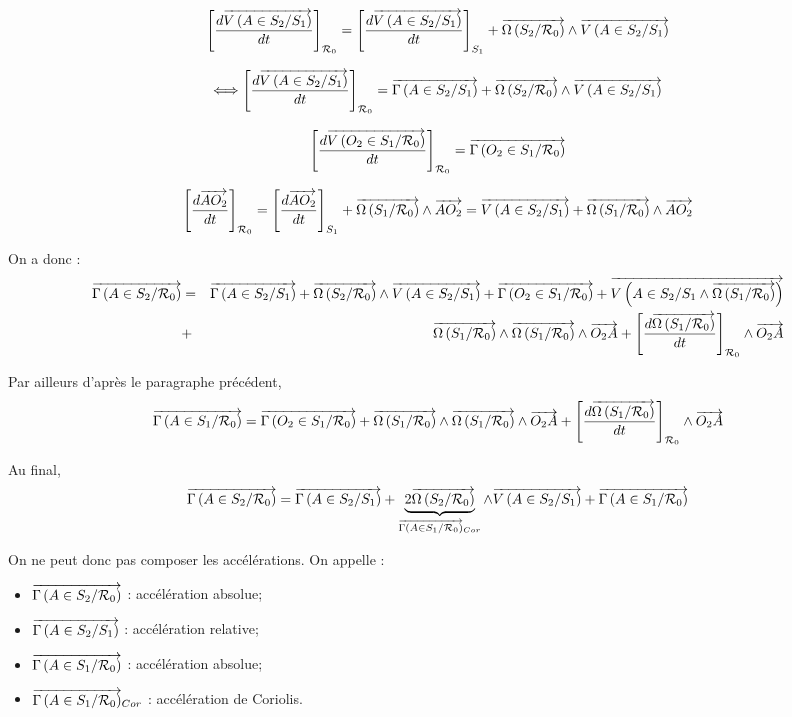 \documentclass[10pt,oneside]{article}
\begin{document}
$$
\left[
\dfrac{d
\vectv{A}{S_2}{S_1} }{dt}
\right]_{\mathcal{R}_0}
=
\left[
\dfrac{d
\vectv{A}{S_2}{S_1} }{dt}
\right]_{S_1}
+
\vecto{S_2}{\mathcal{R}_0}\wedge\vectv{A}{S_2}{S_1}
$$

$$
\Longleftrightarrow
\left[
\dfrac{d
\vectv{A}{S_2}{S_1} }{dt}
\right]_{\mathcal{R}_0}
=
\vectg{A}{S_2}{S_1} 
+
\vecto{S_2}{\mathcal{R}_0}\wedge\vectv{A}{S_2}{S_1}
$$


$$
\left[
\dfrac{d\vectv{O_2}{S_1}{\mathcal{R}_0}}{dt}
\right]_{\mathcal{R}_0} 
= \vectg{O_2}{S_1}{\mathcal{R}_0}
$$

$$
\left[
\dfrac{d\vect{AO_2}}{dt}
\right]_{\mathcal{R}_0}
=
\left[
\dfrac{d\vect{AO_2}}{dt}
\right]_{S_1}
+
\vecto{S_1}{\mathcal{R}_0}
\wedge 
\vect{AO_2}
=
\vectv{A}{S_2}{S_1}+
\vecto{S_1}{\mathcal{R}_0}
\wedge 
\vect{AO_2}
$$


On a donc : 
\begin{eqnarray*}
\vectg{A}{S_2}{\mathcal{R}_0}
&=&
\vectg{A}{S_2}{S_1} + \vecto{S_2}{\mathcal{R}_0}\wedge\vectv{A}{S_2}{S_1}
+\vectg{O_2}{S_1}{\mathcal{R}_0}
+\vectv{A}{S_2}{S_1\wedge \vecto{S_1}{\mathcal{R}_0}}\\
&+&\vecto{S_1}{\mathcal{R}_0} \wedge \vecto{S_1}{\mathcal{R}_0} \wedge \vect{O_2A}
+
\left[
\dfrac{d\vecto{S_1}{\mathcal{R}_0}}{dt}
\right]_{\mathcal{R}_0}
\wedge 
\vect{O_2A}
\end{eqnarray*}

Par ailleurs d'après le paragraphe précédent, 
$$
\vectg{A}{S_1}{\mathcal{R}_0} 
= \vectg{O_2}{S_1}{\mathcal{R}_0} 
+\vecto{S_1}{\mathcal{R}_0} \wedge \vecto{S_1}{\mathcal{R}_0}
\wedge \vect{O_2A}
+\left[\dfrac{d\vecto{S_1}{\mathcal{R}_0}}{dt}\right]_{\mathcal{R}_0} \wedge \vect{O_2A} 
$$

Au final, 
$$
\vectg{A}{S_2}{\mathcal{R}_0}
=
\vectg{A}{S_2}{S_1} + \underbrace{2\vecto{S_2}{\mathcal{R}_0}}_{\vectg{A}{S_1}{\mathcal{R}_0}_{Cor}}\wedge\vectv{A}{S_2}{S_1}
+\vectg{A}{S_1}{\mathcal{R}_0} 
$$


\begin{resultat}
On ne peut donc pas composer les accélérations.
On appelle : 
\begin{itemize}
\item $\vectg{A}{S_2}{\mathcal{R}_0}$ : accélération absolue;
\item $\vectg{A}{S_2}{S_1}$ : accélération relative;
\item $\vectg{A}{S_1}{\mathcal{R}_0}$ : accélération absolue;
\item $\vectg{A}{S_1}{\mathcal{R}_0}_{Cor}$ : accélération de Coriolis.
\end{itemize}
\end{resultat}
\end{document}
